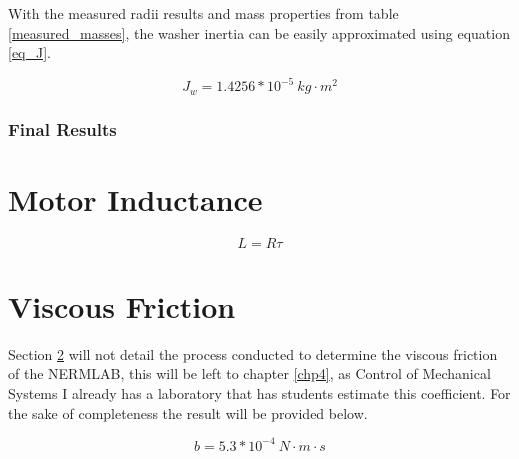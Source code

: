 With the measured radii results and mass properties from table \ref{measured_masses}, the washer inertia can be easily approximated using equation \ref{eq_J}.

\begin{tcolorbox}[
	standard jigsaw,
	opacityback=0]
	\[J_w = 1.4256*10^{-5} \ kg \cdot m^2\]
\end{tcolorbox}


\subsubsection{Final Results}


\section{Motor Inductance}

\[L = R\tau\]

\section{Viscous Friction}
\label{viscous_friction}

Section \ref{viscous_friction} will not detail the process conducted to determine the viscous friction of the NERMLAB, this will be left to chapter \ref{chp4}, as Control of Mechanical Systems I already has a laboratory that has students estimate this coefficient. For the sake of completeness the result will be provided below.

\begin{tcolorbox}[
	standard jigsaw,
	opacityback=0]
	\[b = 5.3*10^{-4} \ N\cdot m\cdot s\]
\end{tcolorbox}

